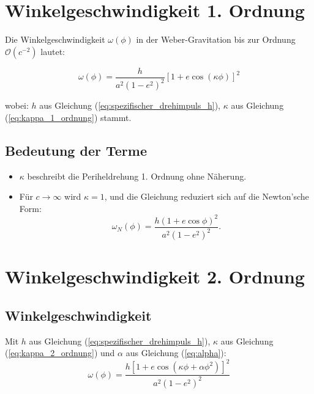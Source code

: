 \newpage
\section{Winkelgeschwindigkeit 1. Ordnung}
Die Winkelgeschwindigkeit \(\omega(\phi)\) in der Weber-Gravitation bis zur Ordnung \(\mathcal{O}(c^{-2})\) lautet:

\begin{equation}
\label{eq:winkelgeschwindigkeit_1_ordnung}
\omega(\phi) = \frac{h}{a^2(1 - e^2)^2} \left[1 + e \cos\left(\kappa\phi\right)\right]^2
\end{equation}

wobei:
$h$ aus Gleichung (\ref{eq:spezifischer_drehimpuls_h}), $\kappa$ aus Gleichung (\ref{eq:kappa_1_ordnung}) stammt.

\subsection*{Bedeutung der Terme}
\begin{itemize}
    \item \(\kappa\) beschreibt die Periheldrehung 1. Ordnung ohne Näherung.
    \item Für \(c \to \infty\) wird \(\kappa = 1\), und die Gleichung reduziert sich auf die Newton’sche Form:
    \[
    \omega_N(\phi) = \frac{h(1 + e \cos\phi)^2}{a^2(1 - e^2)^2}.
    \]
\end{itemize}

\section{Winkelgeschwindigkeit 2. Ordnung}

\subsection{Winkelgeschwindigkeit}
Mit $h$ aus Gleichung (\ref{eq:spezifischer_drehimpuls_h}), $\kappa$ aus Gleichung (\ref{eq:kappa_2_ordnung}) und $\alpha$ aus Gleichung (\ref{eq:alpha}):
\begin{equation}
\label{eq:winkelgeschwindigkeit_2_ordnung}
\boxed
{
    \omega(\phi) = \frac{h[1 + e\cos(\kappa\phi + \alpha\phi^2)]^2}{a^2(1-e^2)^2}
}
\end{equation}
